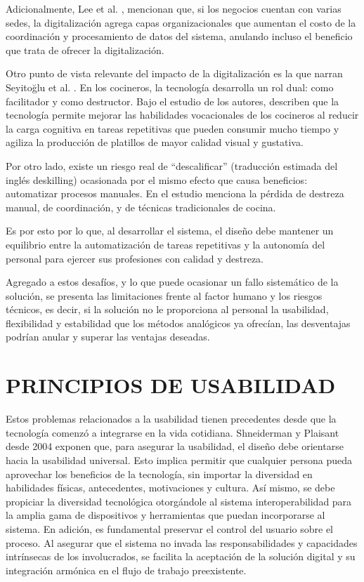 Adicionalmente, Lee et al. \cite{woojin2024effect}, \cite{woojin2026multifaceted} mencionan que, si los negocios cuentan con varias sedes, la digitalización agrega capas organizacionales que aumentan el costo de la coordinación y procesamiento de datos del sistema, anulando incluso el beneficio que trata de ofrecer la digitalización.  

Otro punto de vista relevante del impacto de la digitalización es la que narran Seyito\u{g}lu et al. \cite{seyitoglu2025role}. En los cocineros, la tecnología desarrolla un rol dual: como facilitador y como destructor. Bajo el estudio de los autores, describen que la tecnología permite mejorar las habilidades vocacionales de los cocineros al reducir la carga cognitiva en tareas repetitivas que pueden consumir mucho tiempo y agiliza la producción de platillos de mayor calidad visual y gustativa. 

Por otro lado, existe un riesgo real de ``descalificar'' (traducción estimada del inglés deskilling) ocasionada por el mismo efecto que causa beneficios: automatizar procesos manuales. En el estudio menciona la pérdida de destreza manual, de coordinación, y de técnicas tradicionales de cocina.  

Es por esto por lo que, al desarrollar el sistema, el diseño debe mantener un equilibrio entre la automatización de tareas repetitivas y la autonomía del personal para ejercer sus profesiones con calidad y destreza.

Agregado a estos desafíos, y lo que puede ocasionar un fallo sistemático de la solución, se presenta las limitaciones frente al factor humano y los riesgos técnicos, es decir, si la solución no le proporciona al personal la usabilidad, flexibilidad y estabilidad que los métodos analógicos ya ofrecían, las desventajas podrían anular y superar las ventajas deseadas. 

\section{PRINCIPIOS DE USABILIDAD}
Estos problemas relacionados a la usabilidad tienen precedentes desde que la tecnología comenzó a integrarse en la vida cotidiana. Shneiderman y Plaisant \cite{shneiderman2005designing} desde 2004 exponen que, para asegurar la usabilidad, el diseño debe orientarse hacia la usabilidad universal. Esto implica permitir que cualquier persona pueda aprovechar los beneficios de la tecnología, sin importar la diversidad en habilidades físicas, antecedentes, motivaciones y cultura. Así mismo, se debe propiciar la diversidad tecnológica otorgándole al sistema interoperabilidad para la amplia gama de dispositivos y herramientas que puedan incorporarse al sistema. En adición, es fundamental preservar el control del usuario sobre el proceso. Al asegurar que el sistema no invada las responsabilidades y capacidades intrínsecas de los involucrados, se facilita la aceptación de la solución digital y su integración armónica en el flujo de trabajo preexistente.

